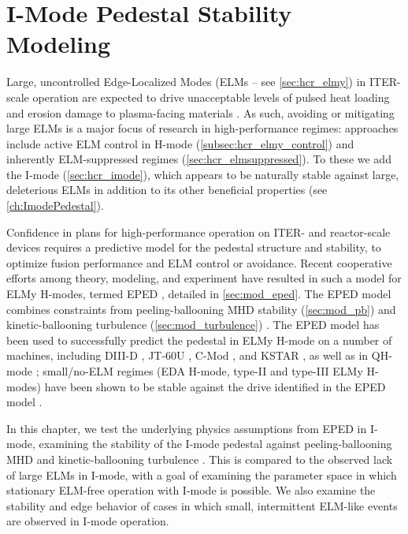 \chapter{I-Mode Pedestal Stability Modeling}\label{ch:ImodeModeling}

Large, uncontrolled Edge-Localized Modes (ELMs -- see \cref{sec:hcr_elmy}) in ITER-scale operation are expected to drive unacceptable levels of pulsed heat loading and erosion damage to plasma-facing materials \cite{Loarte2003,Federici2003}.  As such, avoiding or mitigating large ELMs is a major focus of research in high-performance regimes: approaches include active ELM control in H-mode (\cref{subsec:hcr_elmy_control}) and inherently ELM-suppressed regimes (\cref{sec:hcr_elmsuppressed}).  To these we add the I-mode (\cref{sec:hcr_imode}), which appears to be naturally stable against large, deleterious ELMs in addition to its other beneficial properties (see \cref{ch:ImodePedestal}).

Confidence in plans for high-performance operation on ITER- and reactor-scale devices requires a predictive model for the pedestal structure and stability, to optimize fusion performance and ELM control or avoidance.  Recent cooperative efforts among theory, modeling, and experiment \cite{Groebner2013} have resulted in such a model for ELMy H-modes, termed EPED \cite{Snyder2009,Snyder2011}, detailed in \cref{sec:mod_eped}.  The EPED model combines constraints from peeling-ballooning MHD stability (\cref{sec:mod_pb}) \cite{Wilson2002,Snyder2004,Wilson2006} and kinetic-ballooning turbulence (\cref{sec:mod_turbulence}) \cite{Snyder1999,Candy2005,Snyder2001}.  The EPED model has been used to successfully predict the pedestal in ELMy H-mode on a number of machines, including DIII-D \cite{Snyder2009,Snyder2011}, JT-60U \cite{Snyder2009}, C-Mod \cite{Walk2012}, and KSTAR \cite{Han2013}, as well as in QH-mode \cite{Snyder2012}; small/no-ELM regimes (EDA H-mode, type-II and type-III ELMy H-modes) have been shown to be stable against the drive identified in the EPED model \cite{Snyder2009}.

In this chapter, we test the underlying physics assumptions from EPED in I-mode, examining the stability of the I-mode pedestal against peeling-ballooning MHD and kinetic-ballooning turbulence \cite{Walk2014}.  This is compared to the observed lack of large ELMs in I-mode, with a goal of examining the parameter space in which stationary ELM-free operation with I-mode is possible.  We also examine the stability and edge behavior of cases in which small, intermittent ELM-like events are observed in I-mode operation.\nicesectionending

